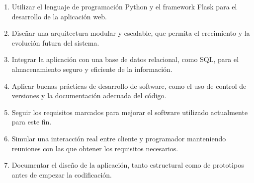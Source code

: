\begin{enumerate}
  \item Utilizar el lenguaje de programación Python y el framework Flask para el desarrollo de la aplicación web.
  \item Diseñar una arquitectura modular y escalable, que permita el crecimiento y la evolución futura del sistema.
  \item Integrar la aplicación con una base de datos relacional, como SQL, para el almacenamiento seguro y eficiente de la información.
  \item Aplicar buenas prácticas de desarrollo de software, como el uso de control de versiones y la documentación adecuada del código.
  \item Seguir los requisitos marcados para mejorar el software utilizado actualmente para este fin.
  \item Simular una interacción real entre cliente y programador manteniendo reuniones con las que obtener los requisitos necesarios.
  \item Documentar el diseño de la aplicación, tanto estructural como de prototipos antes de empezar la codificación.
\end{enumerate}
